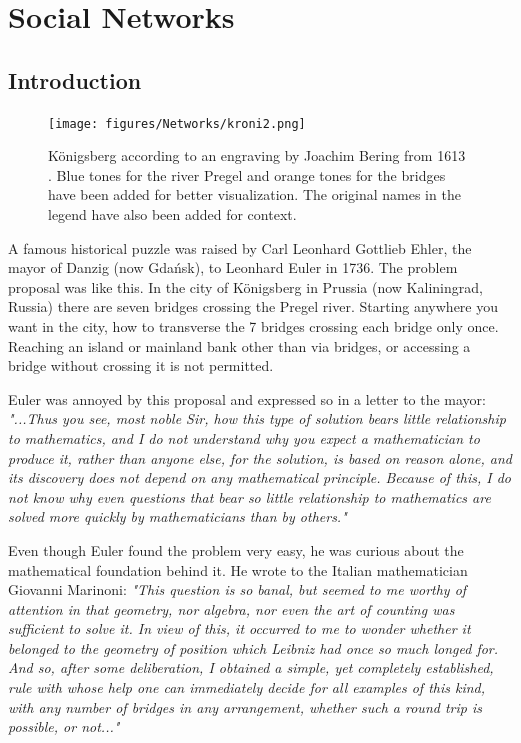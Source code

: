\chapter{Social Networks}\label{ch:networks}

\section{Introduction}

    \begin{figure}[H]
        \centering
            \texttt{[image: figures/Networks/kroni2.png]} 
        \caption{Königsberg according to an engraving by Joachim Bering from 1613 \cite{ref:konisMap}. Blue tones for the river Pregel and orange tones for the bridges have been added for better visualization. The original names in the legend have also been added for context.}
        \label{figure:networkBridges}
    \end{figure}


A famous historical puzzle was raised by Carl Leonhard Gottlieb Ehler, the mayor of Danzig (now Gdańsk), to Leonhard Euler in 1736. The problem proposal was like this. In the city of Königsberg in Prussia (now Kaliningrad, Russia) there are seven bridges crossing the Pregel river. Starting anywhere you want in the city, how to transverse the 7 bridges crossing each bridge only once. Reaching an island or mainland bank other than via bridges, or accessing a bridge without crossing it is not permitted.

Euler was annoyed by this proposal and expressed so in a letter to the mayor: \textit{"...Thus you see, most noble Sir, how this type of solution bears little relationship to mathematics, and I do not understand why you expect a mathematician to produce it, rather than anyone else, for the solution, is based on reason alone, and its discovery does not depend on any mathematical principle.  Because of this, I do not know why even questions that bear so little relationship to mathematics are solved more quickly by mathematicians than by others."}

Even though Euler found the problem very easy, he was curious about the mathematical foundation behind it. He wrote to the Italian mathematician Giovanni Marinoni: \textit{"This question is so banal, but seemed to me worthy of attention in that geometry, nor algebra, nor even the art of counting was sufficient to solve it. In view of this, it occurred to me to wonder whether it belonged to the geometry of position which Leibniz had once so much longed for. And so, after some deliberation, I obtained a simple, yet completely established, rule with whose help one can immediately decide for all examples of this kind, with any number of bridges in any arrangement, whether such a round trip is possible, or not..."}

